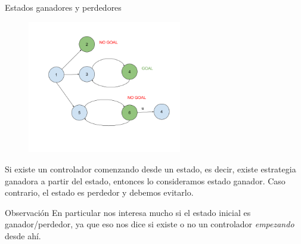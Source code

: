 \begin{frame}{Estados ganadores y perdedores}
	
	\begin{figure}
		\vspace{-1cm}
		\hspace{-0.8cm}
		\includegraphics[width=0.6\textwidth]{figures/como-marcar-goals-FACAS.png}
	\end{figure}
	
    Si existe un controlador comenzando desde un estado, es decir, existe estrategia ganadora a partir del estado, entonces lo consideramos estado ganador. 
    Caso contrario, el estado es perdedor y debemos evitarlo.
    
    \vspace{0.5cm}
    \begin{block}{Observación}
        En particular nos interesa mucho si el estado inicial es ganador/perdedor, ya que eso nos dice si existe o no un controlador \textit{empezando} desde ahí.
    \end{block}

\end{frame}
